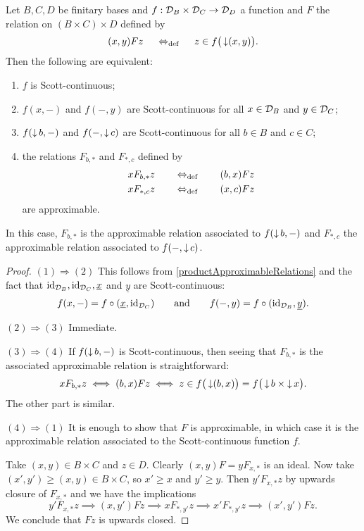\begin{proposition}
Let $B,C,D$ be finitary bases and $f: \mathcal{D}_B\times \mathcal{D}_C\to \mathcal{D}_D$ a function and $F$ the relation on $(B\times C)\times D$ defined by
\[ (x,y)Fz \;\quad\Leftrightarrow_{\text{def}}\quad\; z\in f\big(\operatorname{\downarrow} (x,y)\big). \]
Then the following are equivalent:
\begin{enumerate}
\item $f$ is Scott-continuous;
\item $f(x,-)$ and $f(-,y)$ are Scott-continuous for all $x\in \mathcal{D}_B$ and $y\in \mathcal{D}_C$;
\item $f(\operatorname{\downarrow} b,-)$ and $f(-,\operatorname{\downarrow} c)$ are Scott-continuous for all $b\in B$ and $c\in C$;
\item the relations $F_{b,*}$ and $F_{*,c}$ defined by
\begin{align*}
xF_{b,*}z \quad &\quad\Leftrightarrow_{\text{def}}\quad \quad (b,x)Fz \\
xF_{*,c}z \quad &\quad\Leftrightarrow_{\text{def}}\quad \quad (x,c)Fz
\end{align*}
are approximable.
\end{enumerate}
In this case, $F_{b,*}$ is the approximable relation associated to $f(\operatorname{\downarrow} b,-)$ and $F_{*,c}$ the approximable relation associated to $f(-,\operatorname{\downarrow} c)$.
\end{proposition}
\begin{proof}
$(1) \Rightarrow (2)$ This follows from \ref{productApproximableRelations} and the fact that $\operatorname{id}_{\mathcal{D}_B}, \operatorname{id}_{\mathcal{D}_C}, \underline{x}$ and $\underline{y}$ are Scott-continuous:
\[ f(x, -) = f \circ (\underline{x}, \operatorname{id}_{\mathcal{D}_C}) \qquad\text{and}\qquad f(-, y) = f \circ (\operatorname{id}_{\mathcal{D}_B}, \underline{y}). \]

$(2) \Rightarrow (3)$ Immediate.

$(3) \Rightarrow (4)$ If $f(\operatorname{\downarrow} b,-)$ is Scott-continuous, then seeing that $F_{b,*}$ is the associated approximable relation is straightforward:
\[ xF_{b,*}z \iff (b,x)Fz \iff z \in f\big(\operatorname{\downarrow} (b,x)\big) = f\big(\operatorname{\downarrow} b \times \operatorname{\downarrow} x\big). \]
The other part is similar.

$(4) \Rightarrow (1)$ It is enough to show that $F$ is approximable, in which case it is the approximable relation associated to the Scott-continuous function $f$.

Take $(x,y)\in B\times C$ and $z\in D$. Clearly $(x,y)F = yF_{x,*}$ is an ideal. Now take $(x',y')\geq (x,y)\in B\times C$, so $x'\geq x$ and $y'\geq y$. Then $y'F_{x,*}z$ by upwards closure of $F_{x,*}$ and we have the implications
\[ y'F_{x,*}z \implies (x,y')Fz \implies xF_{*,y'}z \implies x'F_{*,y'}z \implies (x',y')Fz. \]
We conclude that $Fz$ is upwards closed.
\end{proof}




